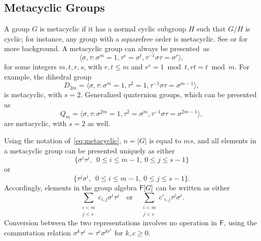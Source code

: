 
\subsection{Metacyclic Groups}

A group $G$ is metacyclic if it has a normal cyclic subgroup $H$ such that
$G/H$ is cyclic; for instance, any group with a squarefree order is
metacyclic. See \citep[p.~88]{Johnson} or \citep[p.~334]{Curtis} for more
background. A metacyclic group can always be presented~as
\begin{equation}
  \label{eq:metacyclic}
  \langle \sigma,\tau: \sigma^m = 1,  \tau^s = \sigma^t, \tau^{-1}\sigma \tau = \sigma^r \rangle,
\end{equation}
for some integers $m,t,r,s$, with $r,t \leq m$ and
$r^s = 1 \bmod t, rt = t \bmod m$. For example, the dihedral group
$$D_{2m} = \langle \sigma,\tau: \sigma^m =1, \tau^2 = 1, \tau^{-1}
\sigma \tau = \sigma^{m-1} \rangle, $$ is metacyclic, with
$s=2$. Generalized quaternion groups, which can be presented as
$$Q_m = \langle \sigma,\tau: \sigma^{2m} =1, \tau^2 = \sigma^m,
\tau^{-1} \sigma \tau = \sigma^{2m-1} \rangle,$$ are metacyclic, with
$s=2$ as well.

Using the notation of~\eqref{eq:metacyclic}, $n=|G|$ is equal to $ms$, and
all elements in a metacyclic group can be presented uniquely as either
\begin{equation}\label{pres1}
\{\sigma^i \tau^j,\,\,\, 0\leq i \leq m-1,\ 0\leq j \leq s-1\}  
\end{equation}
or
\begin{equation}\label{pres2}
\{ \tau^j\sigma^i,\,\,\, 0\leq i \leq m-1,\ 0\leq j \leq s-1\}.
\end{equation}
Accordingly, elements in the group algebra ${\mathsf{F}}[G]$ can be written as 
either 
$$\sum_{\substack{i <m\\ j< s}} c_{i,j} \sigma^i \tau^j \quad\text{or}\quad
\sum_{\substack{i <m\\ j< s}} c'_{i,j} \tau^j \sigma^i.$$
Conversion between the two representations involves no operation in ${\mathsf{F}}$,
using the commutation relation $\sigma^k \tau^c = \tau^c \sigma^{kr^c}$
for $k,c \ge 0$.


